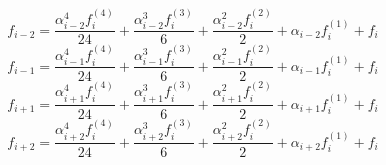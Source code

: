 \begin{equation} 
f_{{i-2}} = \frac{\alpha_{{i-2}}^{4} f^{{(4)}}_{i}}{24} + \frac{\alpha_{{i-2}}^{3} f^{{(3)}}_{i}}{6} + \frac{\alpha_{{i-2}}^{2} f^{{(2)}}_{i}}{2} + \alpha_{{i-2}} f^{{(1)}}_{i} + f_{i}
 \end{equation} 
\begin{equation} 
f_{{i-1}} = \frac{\alpha_{{i-1}}^{4} f^{{(4)}}_{i}}{24} + \frac{\alpha_{{i-1}}^{3} f^{{(3)}}_{i}}{6} + \frac{\alpha_{{i-1}}^{2} f^{{(2)}}_{i}}{2} + \alpha_{{i-1}} f^{{(1)}}_{i} + f_{i}
 \end{equation} 
\begin{equation} 
f_{{i+1}} = \frac{\alpha_{{i+1}}^{4} f^{{(4)}}_{i}}{24} + \frac{\alpha_{{i+1}}^{3} f^{{(3)}}_{i}}{6} + \frac{\alpha_{{i+1}}^{2} f^{{(2)}}_{i}}{2} + \alpha_{{i+1}} f^{{(1)}}_{i} + f_{i}
 \end{equation} 
\begin{equation} 
f_{{i+2}} = \frac{\alpha_{{i+2}}^{4} f^{{(4)}}_{i}}{24} + \frac{\alpha_{{i+2}}^{3} f^{{(3)}}_{i}}{6} + \frac{\alpha_{{i+2}}^{2} f^{{(2)}}_{i}}{2} + \alpha_{{i+2}} f^{{(1)}}_{i} + f_{i}
 \end{equation} 
